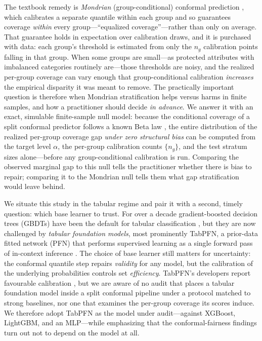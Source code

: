 \documentclass[review,12pt]{elsarticle}
\begin{document}
The textbook remedy is \emph{Mondrian} (group-conditional) conformal prediction \cite{vovk2003,vovk2012,romano2020eq}, which calibrates a separate quantile within each group and so guarantees coverage \emph{within} every group---``equalized coverage''---rather than only on average. That guarantee holds in expectation over calibration draws, and it is purchased with data: each group's threshold is estimated from only the $n_g$ calibration points falling in that group. When some groups are small---as protected attributes with imbalanced categories routinely are---those thresholds are noisy, and the realized per-group coverage can vary enough that group-conditional calibration \emph{increases} the empirical disparity it was meant to remove. The practically important question is therefore when Mondrian stratification helps versus harms in finite samples, and how a practitioner should decide \emph{in advance}. We answer it with an exact, simulable finite-sample null model: because the conditional coverage of a split conformal predictor follows a known Beta law \cite{vovk2012,angelopoulos2023}, the entire distribution of the realized per-group coverage gap \emph{under zero structural bias} can be computed from the target level $\alpha$, the per-group calibration counts $\{n_g\}$, and the test stratum sizes alone---before any group-conditional calibration is run. Comparing the observed marginal gap to this null tells the practitioner whether there is bias to repair; comparing it to the Mondrian null tells them what gap stratification would leave behind.

We situate this study in the tabular regime and pair it with a second, timely question: which base learner to trust. For over a decade gradient-boosted decision trees (GBDTs) have been the default for tabular classification \cite{grinsztajn2022}, but they are now challenged by \emph{tabular foundation models}, most prominently TabPFN, a prior-data fitted network (PFN) that performs supervised learning as a single forward pass of in-context inference \cite{tabpfn2023,tabpfn2025}. The choice of base learner still matters for uncertainty: the conformal quantile step repairs \emph{validity} for any model, but the calibration of the underlying probabilities controls set \emph{efficiency}. TabPFN's developers report favourable calibration \cite{tabpfn2025}, but we are aware of no audit that places a tabular foundation model inside a split conformal pipeline under a protocol matched to strong baselines, nor one that examines the per-group coverage its scores induce. We therefore adopt TabPFN as the model under audit---against XGBoost, LightGBM, and an MLP---while emphasizing that the conformal-fairness findings turn out not to depend on the model at all.
\end{document}

